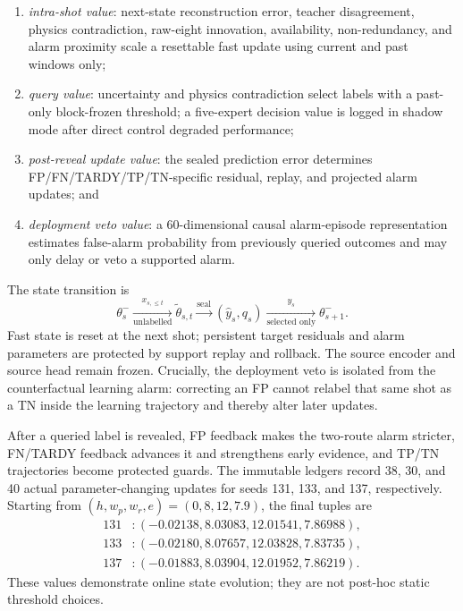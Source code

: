 \documentclass[10pt,twocolumn]{article}
\begin{document}
\begin{enumerate}
  \item \emph{intra-shot value}: next-state reconstruction error, teacher disagreement, physics contradiction, raw-eight innovation, availability, non-redundancy, and alarm proximity scale a resettable fast update using current and past windows only;
  \item \emph{query value}: uncertainty and physics contradiction select labels with a past-only block-frozen threshold; a five-expert decision value is logged in shadow mode after direct control degraded performance;
  \item \emph{post-reveal update value}: the sealed prediction error determines FP/FN/TARDY/TP/TN-specific residual, replay, and projected alarm updates; and
  \item \emph{deployment veto value}: a 60-dimensional causal alarm-episode representation estimates false-alarm probability from previously queried outcomes and may only delay or veto a supported alarm.
\end{enumerate}

The state transition is
\begin{equation}
\theta_{s}^{-}\xrightarrow[\text{unlabelled}]{x_{s,\leq t}}\tilde\theta_{s,t}
\xrightarrow{\text{seal}}(\hat y_s,q_s)
\xrightarrow[\text{selected only}]{y_s}\theta_{s+1}^{-}.
\end{equation}
Fast state is reset at the next shot; persistent target residuals and alarm parameters are protected by support replay and rollback.  The source encoder and source head remain frozen.  Crucially, the deployment veto is isolated from the counterfactual learning alarm: correcting an FP cannot relabel that same shot as a TN inside the learning trajectory and thereby alter later updates.

After a queried label is revealed, FP feedback makes the two-route alarm stricter, FN/TARDY feedback advances it and strengthens early evidence, and TP/TN trajectories become protected guards.  The immutable ledgers record 38, 30, and 40 actual parameter-changing updates for seeds 131, 133, and 137, respectively.  Starting from $(h,w_p,w_r,e)=(0,8,12,7.9)$, the final tuples are
\begin{equation}
\begin{aligned}
131 &: (-0.02138,8.03083,12.01541,7.86988),\\
133 &: (-0.02180,8.07657,12.03828,7.83735),\\
137 &: (-0.01883,8.03904,12.01952,7.86219).
\end{aligned}
\end{equation}
These values demonstrate online state evolution; they are not post-hoc static threshold choices.
\end{document}
